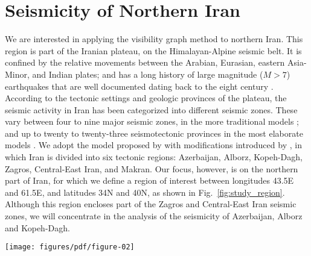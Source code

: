 
\section{Seismicity of Northern Iran}

We are interested in applying the visibility graph method to northern Iran. This region is part of the Iranian plateau, on the Himalayan-Alpine seismic belt. It is confined by the relative movements between the Arabian, Eurasian, eastern Asia-Minor, and Indian plates; and has a long history of large magnitude ($M>7$) earthquakes that are well documented dating back to the eight century  \citep[e.g.,][]{Berberian_1981_Chap}. According to the tectonic settings and geologic provinces of the plateau, the seismic activity in Iran has been categorized into different seismic zones. These vary between four to nine major seismic zones, in the more traditional models \citep[e.g.,][]{Stocklin1968, Takin1972, Berberian1976}; and up to twenty to twenty-three seismotectonic provinces in the most elaborate models \citep[e.g.,][]{Nowroozi1976, Tavakoli1999}. We adopt the model proposed by \citet{Mirzaei1998} with modifications introduced by \citet{Karimiparidari2013}, in which Iran is divided into six tectonic regions: Azerbaijan, Alborz, Kopeh-Dagh, Zagros, Central-East Iran, and Makran. Our focus, however, is on the northern part of Iran, for which we define a region of interest between longitudes 43.5\textdegree{}E and 61.5\textdegree{}E, and latitudes 34\textdegree{}N and 40\textdegree{}N, as shown in Fig.~\ref{fig:study_region}. Although this region encloses part of the Zagros and Central-East Iran seismic zones, we will concentrate in the analysis of the seismicity of Azerbaijan, Alborz and Kopeh-Dagh.

\begin{figure*}[t]
	\centering
	\texttt{[image: figures/pdf/figure-02]} 
	\caption{Region of interest. and tectonic seismic regions. At the top, the map of Iran and surrounding countries is presented. The study area is located in the gray box. At the bottom, the study area containing seismotectonic provinces after \citet{Mirzaei1998} is presented. Dashed line is the subdivision that is proposed by \citet{Karimiparidari2013}}
	\label{fig:study_region}
\end{figure*}





